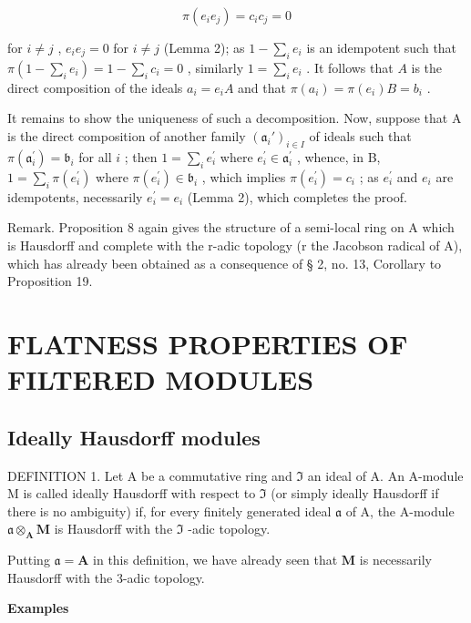 \[
\pi (e _ {i} e _ {j}) = c _ {i} c _ {j} = 0
\]

for \(i \neq j\) , \(e_i e_j = 0\) for \(i \neq j\) (Lemma 2); as \(1 - \sum_{i} e_i\) is an idempotent such that \(\pi\left(1 - \sum_{i} e_i\right) = 1 - \sum_{i} c_i = 0\) , similarly \(1 = \sum_{i} e_i\) . It follows that \(A\) is the direct composition of the ideals \(a_i = e_i A\) and that \(\pi(a_i) = \pi(e_i) B = b_i\) .

It remains to show the uniqueness of such a decomposition. Now, suppose that A is the direct composition of another family \((\mathfrak{a}_i')_{i\in I}\) of ideals such that \(\pi (\mathfrak{a}_i^{\prime}) = \mathfrak{b}_i\) for all \(i\) ; then \(1 = \sum_{i}e_{i}^{\prime}\) where \(e_i^\prime \in \mathfrak{a}_i^\prime\) , whence, in B, \(1 = \sum_{i}\pi (e_i^{\prime})\) where \(\pi (e_i^{\prime})\in \mathfrak{b}_i\) , which implies \(\pi (e_i^{\prime}) = c_i\) ; as \(e_i^\prime\) and \(e_i\) are idempotents, necessarily \(e_i^\prime = e_i\) (Lemma 2), which completes the proof.

Remark. Proposition 8 again gives the structure of a semi-local ring on A which is Hausdorff and complete with the r-adic topology (r the Jacobson radical of A), which has already been obtained as a consequence of § 2, no. 13, Corollary to Proposition 19.

\section{FLATNESS PROPERTIES OF FILTERED MODULES}

\subsection{Ideally Hausdorff modules}

DEFINITION 1. Let A be a commutative ring and \(\mathfrak{I}\) an ideal of A. An A-module M is called ideally Hausdorff with respect to \(\mathfrak{I}\) (or simply ideally Hausdorff if there is no ambiguity) if, for every finitely generated ideal \(\mathfrak{a}\) of A, the A-module \(\mathfrak{a} \otimes_{\mathbf{A}} \mathbf{M}\) is Hausdorff with the \(\mathfrak{I}\) -adic topology.

Putting \(\mathfrak{a} = \mathbf{A}\) in this definition, we have already seen that \(\mathbf{M}\) is necessarily Hausdorff with the 3-adic topology.

\textbf{Examples}\par

